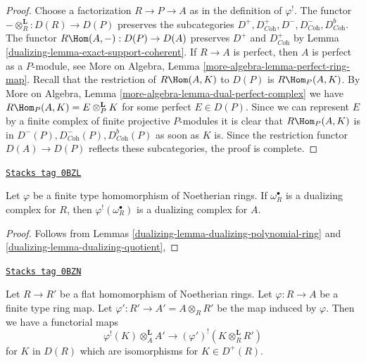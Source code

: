 \begin{proof}

Choose a factorization $R \to P \to A$ as in the definition of $\varphi^!$.
The functor $- \otimes_R^\mathbf{L} : D(R) \to D(P)$ preserves
the subcategories
$D^+, D^+_{\textit{Coh}}, D^-, D^-_{\textit{Coh}}, D^b_{\textit{Coh}}$.
The functor $R\Hom(A, -) : D(P) \to D(A)$
preserves $D^+$ and $D^+_{\textit{Coh}}$ by
Lemma \ref{dualizing-lemma-exact-support-coherent}.
If $R \to A$ is perfect, then $A$ is perfect as a $P$-module, see
More on Algebra, Lemma \ref{more-algebra-lemma-perfect-ring-map}.
Recall that the restriction of $R\Hom(A, K)$ to $D(P)$ is
$R\Hom_P(A, K)$. By More on Algebra, Lemma
\ref{more-algebra-lemma-dual-perfect-complex}
we have $R\Hom_P(A, K) = E \otimes_P^\mathbf{L} K$ for
some perfect $E \in D(P)$. Since we can represent $E$ by
a finite complex of finite projective $P$-modules
it is clear that $R\Hom_P(A, K)$ is in
$D^-(P), D^-_{\textit{Coh}}(P), D^b_{\textit{Coh}}(P)$
as soon as $K$ is. Since the restriction functor
$D(A) \to D(P)$ reflects these subcategories, the
proof is complete.
\end{proof}

\begin{lemma}
\label{dualizing-lemma-shriek-dualizing-algebraic}
\href{https://stacks.math.columbia.edu/tag/0BZL}{\texttt{Stacks tag 0BZL}}

Let $\varphi$ be a finite type homomorphism of Noetherian rings.
If $\omega_R^\bullet$ is a dualizing complex for $R$, then
$\varphi^!(\omega_R^\bullet)$ is a dualizing complex for $A$.
\end{lemma}

\begin{proof}

Follows from Lemmas
\ref{dualizing-lemma-dualizing-polynomial-ring} and
\ref{dualizing-lemma-dualizing-quotient},
\end{proof}

\begin{lemma}[Flat bc]
\label{dualizing-lemma-flat-bc}
\href{https://stacks.math.columbia.edu/tag/0BZN}{\texttt{Stacks tag 0BZN}}

Let $R \to R'$ be a flat homomorphism of Noetherian rings.
Let $\varphi : R \to A$ be a finite type ring map.
Let $\varphi' : R' \to A' = A \otimes_R R'$ be the map induced by $\varphi$.
Then we have a functorial maps
$$
\varphi^!(K) \otimes_A^\mathbf{L} A' \longrightarrow
(\varphi')^!(K \otimes_R^\mathbf{L} R')
$$
for $K$ in $D(R)$ which are isomorphisms for $K \in D^+(R)$.
\end{lemma}

